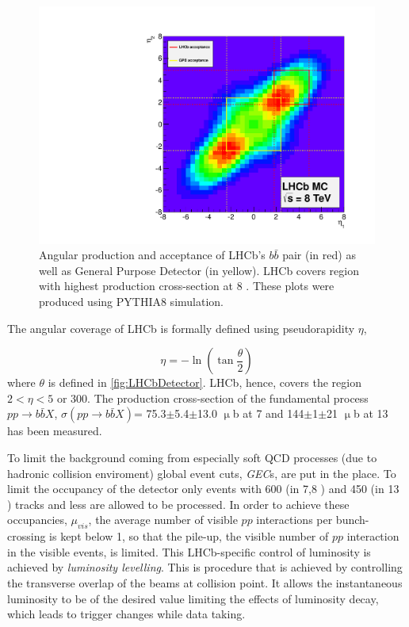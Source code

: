 \begin{figure}
	\centering
	\includegraphics[scale = 0.3]{figs/detector/Acceptance.pdf}
	\caption{Angular production and acceptance of LHCb's $b\bar{b}$ pair (in red) as well as General Purpose Detector (in yellow). LHCb covers region with highest production cross-section at 8 \tev. These plots were produced using PYTHIA8 \cite{pythia8} simulation.}
	\label{fig:Acceptance}
\end{figure}

The angular coverage of LHCb is formally defined using pseudorapidity $\eta$, 

\begin{equation}
	\eta = -\ln (\tan\frac{\theta}{2})
\end{equation}	
where $\theta$ is defined in \autoref{fig:LHCbDetector}. \Gls{LHCb}, hence, covers the region $2<\eta<5$ or 300\mrad. The production cross-section of the fundamental process $pp\rightarrow b\bar{b}X$, $\sigma (pp\rightarrow b\bar{b}X)$= 75.3$\pm$5.4$\pm$13.0 $\upmu$b at 7 \tev \cite{LHCb-PAPER-2010-002} and 144$\pm$1$\pm$21 $\upmu$b at 13 \tev \cite{LHCb-PAPER-2016-031} has been measured.

To limit the background coming from especially soft QCD processes (due to hadronic collision enviroment) global event cuts, \textit{GEC}s, are put in the place. To limit the occupancy of the detector only events with 600 (in 7,8 \tev) and 450 (in 13 \tev) tracks and less are allowed to be processed. In order to achieve these occupancies, $\mu_{vis}$, the average number of visible $pp$ interactions per bunch-crossing is kept below 1, so that the pile-up, the visible number of $pp$ interaction in the visible events, is limited. This LHCb-specific control of luminosity is achieved by \textit{luminosity levelling}. This is procedure that is achieved by controlling the transverse
overlap of the beams at collision point. It allows the instantaneous luminosity to be of the desired value limiting the effects of luminosity decay, which leads to trigger changes while data taking.

